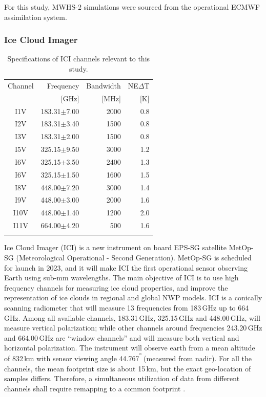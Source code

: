 \documentclass[amt, manuscript]{copernicus}
\begin{document}
For this study, MWHS-2 simulations were sourced from the operational ECMWF assimilation system.

\subsubsection{Ice Cloud Imager}
%
\begin{table}[t]	
	\caption{Specifications of ICI channels relevant to this study.}
	\label{tab:ICI_MWI_channels}
	\begin{tabular}{crrr}
		\tophline
		Channel & Frequency 	& Bandwidth  	&NE$\Delta$T	\\
				& [GHz]			& [MHz]			& [K]			\\
		\middlehline
		I1V&	183.31$\pm$7.00    & 2000 			& 0.8 		\\
		I2V&	183.31$\pm$3.40    & 1500 			& 0.8 		\\
		I3V&	183.31$\pm$2.00    & 1500			& 0.8 		\\
		I5V&	325.15$\pm$9.50    & 3000			& 1.2 		\\
		I6V&	325.15$\pm$3.50    & 2400			& 1.3 		\\
		I6V&	325.15$\pm$1.50    & 1600			& 1.5 		\\
		I8V&	448.00$\pm$7.20    & 3000			& 1.4 		\\
		I9V&	448.00$\pm$3.00    & 2000			& 1.6 		\\
		I10V&	448.00$\pm$1.40    & 1200			& 2.0 		\\
		I11V&	664.00$\pm$4.20    & \phantom{0}500	& 1.6 		\\		
		\bottomhline
	\end{tabular}
	\belowtable{} %
\end{table}

Ice Cloud Imager (ICI) is a new instrument on board EPS-SG satellite MetOp-SG (Meteorological Operational - Second Generation). MetOp-SG is scheduled for launch in 2023, and it will make ICI the first operational sensor observing Earth using sub-mm wavelengths. The main objective of ICI is to use high frequency channels for measuring ice cloud properties, and improve the representation of ice clouds in regional and global NWP models. ICI is a conically scanning radiometer that will measure 13 frequencies from 183\,GHz up to 664\, GHz.  Among all available channels, 183.31\,GHz, 325.15\,GHz and 448.00\,GHz, will measure vertical polarization;  while other channels around frequencies 243.20\,GHz and 664.00\,GHz are ``window channels'' and will measure both vertical and horizontal polarization. The instrument will observe earth from a mean altitude of 832\,km with sensor viewing angle 44.767$^\unit{^{\degree}}$(measured from nadir). For all the channels, the mean footprint size is about 15\,km, but the exact geo-location of samples differs. Therefore, a simultaneous utilization of data from different channels shall require remapping to a common footprint \citep{eriksson:towar:20}.
\end{document}
